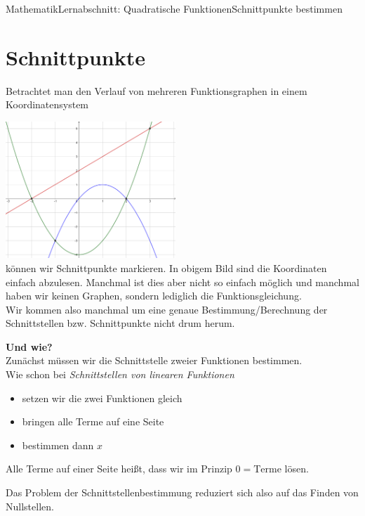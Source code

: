 \documentclass[11pt,twocolumn,oneside,openany,headings=optiontotoc,11pt,numbers=noenddot]{article}
\begin{document}
	\begin{worksheet}{Mathematik}{Lernabschnitt: Quadratische Funktionen}{Schnittpunkte bestimmen}
		\setcounter{section}{4}
		\section{Schnittpunkte}
		Betrachtet man den Verlauf von mehreren Funktionsgraphen in einem Koordinatensystem\\
		\par\noindent
		\includegraphics[width=0.48\textwidth]{../99_Bilder/024_NST.png}\\
		können wir Schnittpunkte markieren. In obigem Bild sind die Koordinaten einfach abzulesen. Manchmal ist dies aber nicht so einfach möglich und manchmal haben wir keinen Graphen, sondern lediglich die Funktionsgleichung.\\
		Wir kommen also manchmal um eine genaue Bestimmung/Berechnung der Schnittstellen bzw. Schnittpunkte nicht drum herum.\\
		\par\noindent
		\textbf{Und wie?}\\
		Zunächst müssen wir die Schnittstelle zweier Funktionen bestimmen.\\
		Wie schon bei \textit{Schnittstellen von linearen Funktionen}
		\begin{itemize}
			\item setzen wir die zwei Funktionen gleich
			\item bringen alle Terme auf eine Seite
			\item bestimmen dann \(x\)
		\end{itemize}
		Alle Terme auf einer Seite heißt, dass wir im Prinzip \(0 = \text{Terme}\) lösen.\\
		\par\noindent
		Das Problem der Schnittstellenbestimmung reduziert sich also auf das Finden von Nullstellen.\\
		\par\noindent

\end{worksheet}
\end{document}
